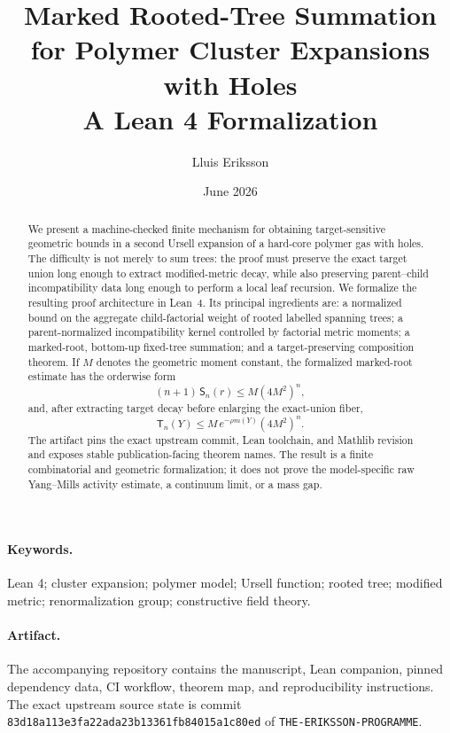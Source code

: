 \documentclass[11pt]{article}
\title{\textbf{Marked Rooted-Tree Summation for Polymer Cluster Expansions with Holes}\\[0.4em]
\large A Lean 4 Formalization}
\author{Lluis Eriksson}
\date{June 2026}
\newcommand{\TargetTerm}{\mathsf T}
\newcommand{\MarkedSum}{\mathsf S}
\begin{document}
\maketitle

\begin{abstract}
We present a machine-checked finite mechanism for obtaining target-sensitive geometric bounds in a second Ursell expansion of a hard-core polymer gas with holes.  The difficulty is not merely to sum trees: the proof must preserve the exact target union long enough to extract modified-metric decay, while also preserving parent--child incompatibility data long enough to perform a local leaf recursion.  We formalize the resulting proof architecture in Lean~4.  Its principal ingredients are: a normalized bound on the aggregate child-factorial weight of rooted labelled spanning trees; a parent-normalized incompatibility kernel controlled by factorial metric moments; a marked-root, bottom-up fixed-tree summation; and a target-preserving composition theorem.  If $M$ denotes the geometric moment constant, the formalized marked-root estimate has the orderwise form
\[
  (n+1)\,\MarkedSum_n(r)\le M(4M^2)^n,
\]
and, after extracting target decay before enlarging the exact-union fiber,
\[
  \TargetTerm_n(Y)\le M\,e^{-\rho m(Y)}(4M^2)^n.
\]
The artifact pins the exact upstream commit, Lean toolchain, and Mathlib revision and exposes stable publication-facing theorem names.  The result is a finite combinatorial and geometric formalization; it does not prove the model-specific raw Yang--Mills activity estimate, a continuum limit, or a mass gap.
\end{abstract}

\paragraph{Keywords.}
Lean 4; cluster expansion; polymer model; Ursell function; rooted tree; modified metric; renormalization group; constructive field theory.

\paragraph{Artifact.}
The accompanying repository contains the manuscript, Lean companion, pinned dependency data, CI workflow, theorem map, and reproducibility instructions.  The exact upstream source state is commit
\texttt{83d18a113e3fa22ada23b13361fb84015a1c80ed} of \texttt{THE-ERIKSSON-PROGRAMME}.

\tableofcontents
\end{document}
